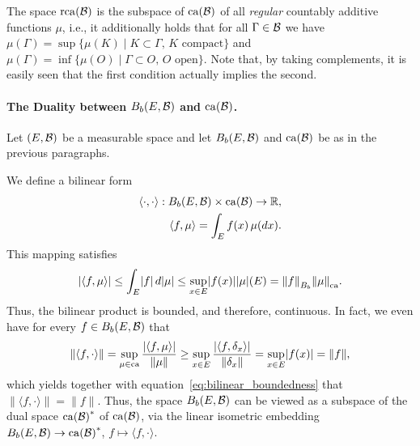\documentclass[../Master.tex]{subfiles}
\begin{document}
The space \(\mathrm{rca}(\mathcal{B})\) is the subspace of \(\mathrm{ca}(\mathcal{B})\) of all \emph{regular} countably additive functions \(\mu{}\), i.e., it additionally holds that for all \(\Gamma \in \mathcal{B}\) we have \(\mu(\Gamma) = \sup{}\{\mu(K) \mid K \subset \Gamma, \, K \text{ compact}\}{}\) and \(\mu(\Gamma) = \inf{}\{\mu(O) \mid \Gamma \subset O, \, O \text{ open}\}{}\).
Note that, by taking complements, it is easily seen that the first condition actually implies the second.

\paragraph{The Duality between \(B_b(E,\mathcal{B})\) and \(\mathrm{ca}(\mathcal{B})\).}
Let \((E, \mathcal{B})\) be a measurable space and let \(B_b(E,\mathcal{B})\) and \(\mathrm{ca}(\mathcal{B})\) be as in the previous paragraphs.

We define a bilinear form 
\begin{equation}\label{eq:bilinear_mapping}
  \begin{aligned}
    \langle \cdot, \cdot \rangle: B_b(E,\mathcal{B}) \times \mathrm{ca}(\mathcal{B}) \to \mathbb{R}&, \\
    \langle f, \mu \rangle = \int_E f(x) \, \mu(dx)&.
  \end{aligned}
\end{equation}
This mapping satisfies
\begin{equation}\label{eq:bilinear_boundedness}
  \left\lvert \langle f, \mu \rangle \right\rvert \le \int_E \lvert f \rvert \, d\lvert\mu\rvert \le \sup_{x \in E} \lvert f(x) \rvert \lvert\mu\rvert(E) = {\lVert f \rVert}_{B_b} {\lVert \mu \rVert}_{\mathrm{ca}}.
\end{equation}
Thus, the bilinear product is bounded, and therefore, continuous. In fact, we even have for every \(f \in B_b(E, \mathcal{B})\) that
\begin{equation}\label{eq:first_bilinear_coercivity}
  \left\lVert \langle f, \cdot \rangle \right\rVert = \sup_{\mu \in \mathrm{ca}} \frac{\left\lvert \langle f, \mu \rangle \right\rvert}{\lVert \mu \rVert} \ge \sup_{x \in E} \frac{\left\lvert \langle f, \delta_x \rangle \right\rvert}{\lVert \delta_x \rVert} = \sup_{x \in E} \lvert f(x) \rvert = \lVert f \rVert,
\end{equation}
which yields together with equation~\eqref{eq:bilinear_boundedness} that \(\left\lVert \langle f, \cdot \rangle \right\rVert = \lVert f \rVert{}\).
Thus, the space \(B_b(E,\mathcal{B})\) can be viewed as a subspace of the dual space \({\mathrm{ca}(\mathcal{B})}^{*}\) of \(\mathrm{ca}(\mathcal{B})\), via the linear isometric embedding \(B_b(E,\mathcal{B}) \to {\mathrm{ca}(\mathcal{B})}^{*}\), \(f \mapsto \langle f, \cdot \rangle{}\).
\end{document}
